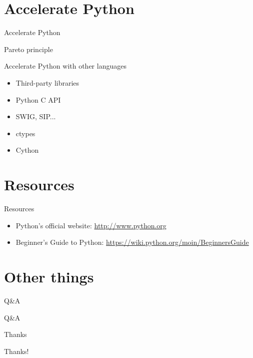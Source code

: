 \documentclass{beamer}
\begin{document}
\section{Accelerate Python}
\begin{frame}{Accelerate Python}\pause
 \begin{block}{Pareto principle}\pause
 \end{block}
 \begin{block}{Accelerate Python with other languages}
  \begin{itemize}
   \item Third-party libraries
   \item Python C API
   \item SWIG, SIP...
   \item ctypes
   \item Cython
  \end{itemize}
 \end{block}
\end{frame}

\section{Resources}
\begin{frame}{Resources}
 \begin{itemize}
  \item Python's official website: \url{http://www.python.org}
  \item Beginner's Guide to Python: \url{https://wiki.python.org/moin/BeginnersGuide}
 \end{itemize}
\end{frame}

\section*{Other things}
\begin{frame}{Q\&A}
\begin{center}
 \Huge Q\&A
\end{center}
\end{frame}

\begin{frame}{Thanks}
\begin{center}
 \Huge Thanks!
\end{center}
\end{frame}
\end{document}
